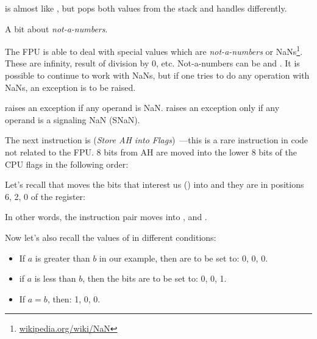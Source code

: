 



\FUCOMPP{} is almost like \FCOM, but pops both values from the stack and handles
 differently.

A bit about \emph{not-a-numbers}.

\newcommand{\NANFN}{\footnote{\href{http://go.yurichev.com/17130}{wikipedia.org/wiki/NaN}}}

The FPU is able to deal with special values which are \emph{not-a-numbers} or \gls{NaN}s\NANFN. 
These are infinity, result of division by 0, etc.
Not-a-numbers can be  and . It is possible to continue to work with  NaNs, 
but if one tries to do any operation with  NaNs, an exception is to be raised.


\FCOM raises an exception if any operand is \gls{NaN}. 
\FUCOM raises an exception only if any operand is a signaling \gls{NaN} (SNaN).

\label{SAHF}

The next instruction is \SAHF (\emph{Store AH into Flags})~---this is a rare 
instruction in code not related to the FPU. 
8 bits from AH are moved into the lower 8 bits of the CPU flags in the following order:




Let's recall that \FNSTSW moves the bits that interest us (\CThreeBits) into \AH 
and they are in positions 6, 2, 0 of the \AH register:



In other words, the  instruction pair moves \CThreeBits into \ZF, \PF and \CF.

Now let's also recall the values of \CThreeBits in different conditions:

\begin{itemize}
\item If $a$ is greater than $b$ in our example, then \CThreeBits are to be set to: 0, 0, 0.
\item if $a$ is less than $b$, then the bits are to be set to: 0, 0, 1.
\item If $a=b$, then: 1, 0, 0.
\end{itemize}

